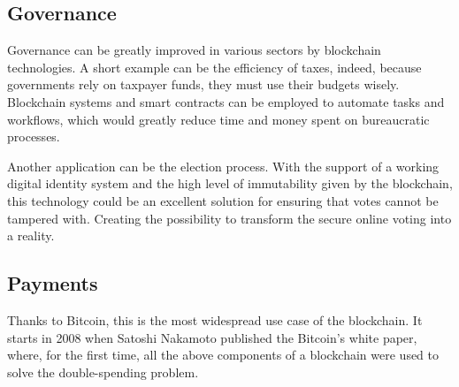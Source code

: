 \subsection{Governance}
\label{sec:governance}

Governance can be greatly improved in various sectors by blockchain technologies.
A short example can be the efficiency of taxes, indeed, because governments rely on 
taxpayer funds, they must use their budgets wisely. Blockchain systems 
and smart contracts can be employed to automate tasks and workflows, which would 
greatly reduce time and money spent on bureaucratic processes.\cite{binancevision}

Another application can be the election process. With the support of a working digital 
identity system and the high level of immutability given by the blockchain, this 
technology could be an excellent solution for ensuring that votes cannot be tampered with.
Creating the possibility to transform the secure online voting into a reality. 

\subsection{Payments}
\label{sec:payments}

Thanks to Bitcoin, this is the most widespread use case of the blockchain. It starts in 
2008 when Satoshi Nakamoto published the Bitcoin's white paper, where, for the first time, 
all the above components of a blockchain were used to solve the double-spending problem.\pagebreak


